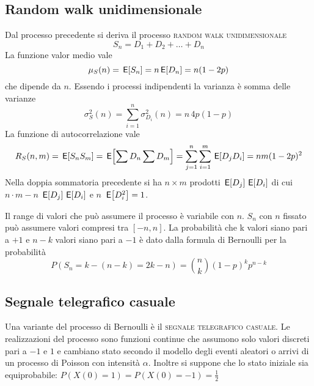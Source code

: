 \subsection{Random walk unidimensionale}
Dal processo precedente si deriva il processo \textsc{random walk unidimensionale}
\begin{equation}
	S_n=D_1+D_2+\dots+D_n
\end{equation}
La funzione valor medio vale
\begin{equation}
	\mu_S(n)=\,{\operatorname{\mathsf{E}}}\!\left[{S_n}\right]=n\,{\operatorname{\mathsf{E}}}\!\left[{D_n}\right]=n(1-2p)
\end{equation}
che dipende da $n$. Essendo i processi indipendenti la varianza è somma delle varianze
\begin{equation}
	\sigma^2_S(n)=\sum_{i=1}^{n}\sigma^2_{D_i}(n)=n\,4p(1-p)
\end{equation}
La funzione di autocorrelazione vale
\begin{equation}
	R_S(n,m)=\,{\operatorname{\mathsf{E}}}\!\left[{S_n S_m}\right]=\,{\operatorname{\mathsf{E}}}\!\left[{\sum D_n \sum D_m}\right]=\sum_{j=1}^{n}\sum_{i=1}^{m}\,{\operatorname{\mathsf{E}}}\!\left[{D_j D_i}\right]=n m(1-2p)^2
\end{equation}
Nella doppia sommatoria precedente si ha $n\times m$ prodotti $\,{\operatorname{\mathsf{E}}}\!\left[{D_j}\right]\,{\operatorname{\mathsf{E}}}\!\left[{D_i}\right]$ di cui $n\cdot m-n$ $\,{\operatorname{\mathsf{E}}}\!\left[{D_j}\right]\,{\operatorname{\mathsf{E}}}\!\left[{D_i}\right]$ e $n$ $\,{\operatorname{\mathsf{E}}}\!\left[{D^2_i}\right]=1$. 

Il range di valori che può assumere il processo è variabile con $n$. $S_n$ con $n$ fissato può assumere valori compresi tra $[-n,n]$. La probabilità che k valori siano pari a $+1$ e $n-k$ valori siano pari a $-1$ è dato dalla formula di Bernoulli per la probabilità
\[
	P(S_n=k-(n-k)=2k-n)=\binom{n}{k}(1-p)^k p^{n-k}
\]

\subsection{Segnale telegrafico casuale}
Una variante del processo di Bernoulli è il \textsc{segnale telegrafico casuale}. Le realizzazioni del processo sono funzioni continue che assumono solo valori discreti pari a $-1$ e $1$ e cambiano stato secondo il modello degli eventi aleatori o arrivi di un processo di Poisson con intensità $\alpha$. Inoltre si suppone che lo stato iniziale sia equiprobabile: $P(X(0)=1)=P(X(0)=-1)=\frac{1}{2}$

\begin{figure}[!h]
	\centering
\end{figure}

